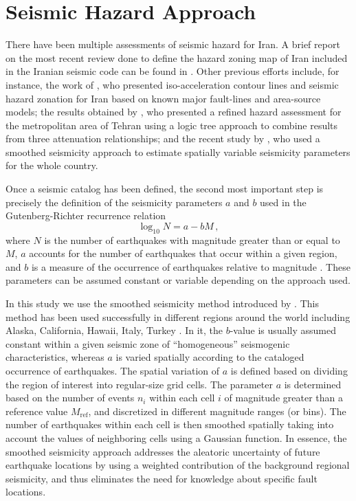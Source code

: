 
\section{Seismic Hazard Approach}

There have been multiple assessments of seismic hazard for Iran. A brief report on the most recent review done to define the hazard zoning map of Iran included in the Iranian seismic code \citep{BHRC2014} can be found in \citet{Moinfar_2012_WCEE}. Other previous efforts include, for instance, the work of \citet{Tavakoli1999}, who presented iso-acceleration contour lines and seismic hazard zonation for Iran based on known major fault-lines and area-source models; the results obtained by \citet{Ghodrati2003}, who presented a refined hazard assessment for the metropolitan area of Tehran using a logic tree approach to combine results from three attenuation relationships; and the recent study by \citet{Khodaverdian_2016_BSSA}, who used a smoothed seismicity approach to estimate spatially variable seismicity parameters for the whole country.

Once a seismic catalog has been defined, the second most important step is precisely the definition of the seismicity parameters $a$ and $b$ used in the Gutenberg-Richter recurrence relation 
% 
\begin{equation}
	\log_{10} N = a - b M \, ,
\end{equation}
% 
\noindent
where $N$ is the number of earthquakes with magnitude greater than or equal to $M$, $a$ accounts for the number of earthquakes that occur within a given region, and $b$ is a measure of the occurrence of earthquakes relative to magnitude \citep{Gutenberg1944}. These parameters can be assumed constant or variable depending on the approach used. 

In this study we use the smoothed seismicity method introduced by \citet{Frankel1995}. This method has been used successfully in different regions around the world including Alaska, California, Hawaii, Italy, Turkey \citep[e.g.,][]{Cao1996, Klein2001, Akinci2004, Kalkan2009, Moschetti2014}. In it, the $b$-value is usually assumed constant within a given seismic zone of ``homogeneous'' seismogenic characteristics, whereas $a$ is varied spatially according to the cataloged occurrence of earthquakes. The spatial variation of $a$ is defined based on dividing the region of interest into regular-size grid cells. The parameter $a$ is determined based on the number of events $n_i$ within each cell $i$ of magnitude greater than a reference value $M_{\mathrm{ref}}$, and discretized in different magnitude ranges (or bins). The number of earthquakes within each cell is then smoothed spatially taking into account the values of neighboring cells using a Gaussian function. In essence, the smoothed seismicity approach addresses the aleatoric uncertainty of future earthquake locations by using a weighted contribution of the background regional seismicity, and thus eliminates the need for knowledge about specific fault locations.

